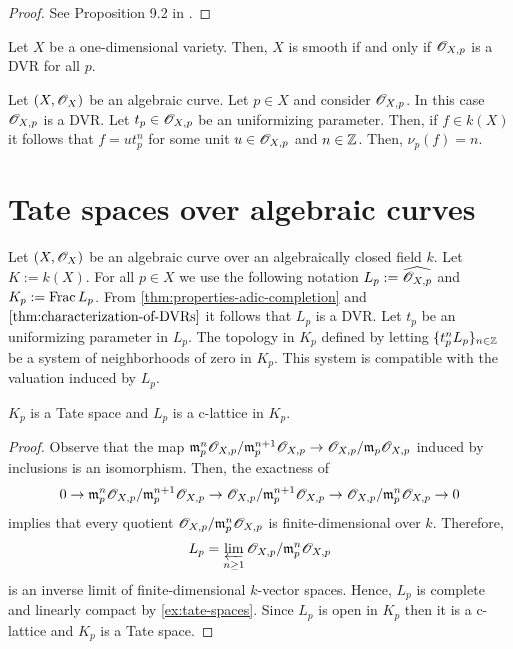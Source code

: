 \begin{proof}
	See Proposition 9.2 in \cite{atiyah}.
\end{proof}
\begin{corollary}\label{cor:smoothness-DVR-curves}
	Let $X$ be a one-dimensional variety. Then, $X$ is smooth if and only if ${\mathscr O}_{X,p}$ is a DVR for all $p$.
\end{corollary}
\begin{example}\label{ex:stalk-of-regular-functions-as-a-DVR}
	Let $(X,{\mathscr O}_{X})$ be an algebraic curve. Let $p \in X$ and consider ${\mathscr O}_{X,p}$. In this case ${\mathscr O}_{X,p}$ is a DVR. Let $t_{p}\in {\mathscr O}_{X,p}$ be an uniformizing parameter. Then, if $f \in k(X)$ it follows that $f = ut_{p}^{n}$ for some  unit $u\in {\mathscr O}_{X,p}$ and $n \in {\mathbb Z}$. Then, $\nu_{p}(f) = n$.
\end{example}
\section{Tate spaces over algebraic curves}
Let $(X,{\mathscr O}_{X})$ be an algebraic curve over an algebraically closed field $k$. Let $K := k(X)$. For all $p \in X$ we use the following notation $L_{p} := \widehat{{\mathscr O}_{X,p}}$ and $K_{p}:=\operatorname{Frac} L_{p}$. From \cref{thm:properties-adic-completion} and $\cref{thm:characterization-of-DVRs}$ it follows that $L_{p}$ is a DVR. Let $t_{p}$ be an uniformizing parameter in $L_{p}$. The topology in $K_{p}$ defined by letting $\{t_{p}^{n}L_{p}\}_{n\in {\mathbb Z}}$ be a system of neighborhoods of zero in $K_{p}$. This system is compatible with the valuation induced by $L_{p}$.
\begin{proposition}\label{prop:complete-fraction-field-is-a-Tate-space}
	$K_{p}$ is a Tate space and $L_{p}$ is a c-lattice in $K_{p}$.
\end{proposition}
\begin{proof}
	Observe that the map $\mathfrak{m}_{p}^{n}{\mathscr O}_{X,p}/\mathfrak{m}_{p}^{n+1}{\mathscr O}_{X,p} \to {\mathscr O}_{X,p}/\mathfrak{m}_{p}{\mathscr O}_{X,p}$ induced by inclusions is an isomorphism. Then, the exactness of
	\[
		0 \to \mathfrak{m}_{p}^{n}{\mathscr O}_{X,p}/\mathfrak{m}_{p}^{n+1}{\mathscr O}_{X,p} \to {\mathscr O}_{X,p}/\mathfrak{m}_{p}^{n+1}{\mathscr O}_{X,p} \to {\mathscr O}_{X,p}/\mathfrak{m}_{p}^{n}{\mathscr O}_{X,p} \to 0
	\]
	implies that every quotient ${\mathscr O}_{X,p}/\mathfrak{m}_{p}^{n}{\mathscr O}_{X,p}$ is finite-dimensional over $k$. Therefore, 
	\[
		L_{p} = \varprojlim_{n\geq 1} {\mathscr O}_{X,p}/\mathfrak{m}_{p}^{n}{\mathscr O}_{X,p}
	\]
	is an inverse limit of finite-dimensional $k$-vector spaces. Hence, $L_{p}$ is complete and linearly compact by \cref{ex:tate-spaces}. Since $L_{p}$ is open in $K_{p}$ then it is a c-lattice and $K_{p}$ is a Tate space.
\end{proof}
